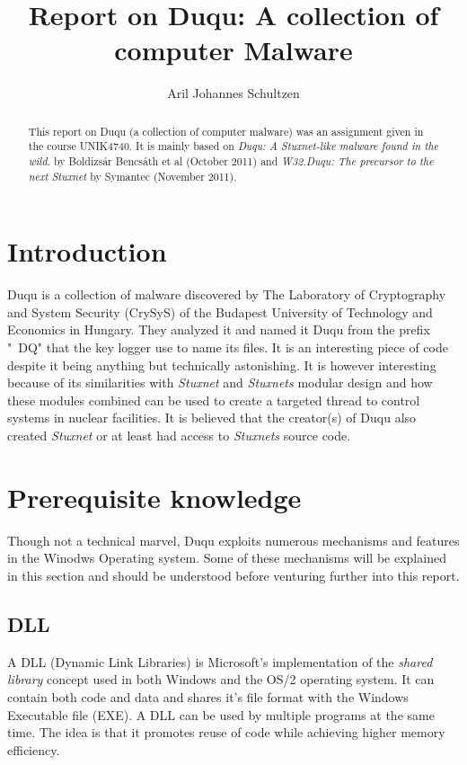 \documentclass[11pt,english,a4paper]{report}
\title{Report on Duqu: A collection of computer Malware}
\author{Aril Johannes Schultzen}
\begin{document}
\maketitle
\thispagestyle{empty}
\setcounter{page}{0}
\tableofcontents
\thispagestyle{empty}
\setcounter{page}{0}
\thispagestyle{empty}
\setcounter{page}{0}
\clearpage
\setcounter{page}{1}

\begin{abstract}
This report on Duqu (a collection of computer malware) was an assignment given in the course UNIK4740. It is mainly based on \textit{Duqu: A Stuxnet-like malware found in the wild.}\cite{DUQU_BUD} by Boldizsár Bencsáth et al (October 2011) and \textit{W32.Duqu: The precursor to the next Stuxnet}\cite{DUQU_SYMANTEC} by Symantec (November 2011).
\end{abstract}
\newpage

\chapter{Introduction}
Duqu is a collection of malware discovered by The Laboratory of Cryptography and System Security (CrySyS) of the Budapest University of Technology and Economics in Hungary. They analyzed it and named it Duqu from the prefix "~DQ" that the key logger use to name its files. It is an interesting piece of code despite it being anything but technically astonishing. It is however interesting because of its similarities with \textit{Stuxnet} and \textit{Stuxnets} modular design and how these modules combined can be used to create a targeted thread to control systems in nuclear facilities. It is believed that the creator(s) of Duqu also created \textit{Stuxnet} or at least had access to \textit{Stuxnets} source code.

\chapter{Prerequisite knowledge}
Though not a technical marvel, Duqu exploits numerous mechanisms and features in the Winodws Operating system. Some of these mechanisms will be explained in this section and should be understood before venturing further into this report.

\section{DLL}
A DLL (Dynamic Link Libraries) is Microsoft's implementation of the \textit{shared library} concept used in both Windows and the OS/2 operating system. It can contain both code and data and shares it's file format with the Windows Executable file (EXE). A DLL can be used by multiple programs at the same time. The idea is that it promotes reuse of code while achieving higher memory efficiency.
\end{document}
